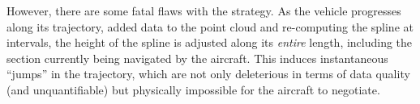 \documentclass[doc]{apa6}
\begin{document}
However, there are some fatal flaws with the strategy. As the vehicle progresses along its trajectory, added data to the point cloud and re-computing the spline at intervals, the height of the spline is adjusted along its \emph{entire} length, including the section currently being navigated by the aircraft. This induces instantaneous ``jumps'' in the trajectory, which are not only deleterious in terms of data quality (and unquantifiable) but physically impossible for the aircraft to negotiate. 

\newpage

\printbibliography
\end{document}
